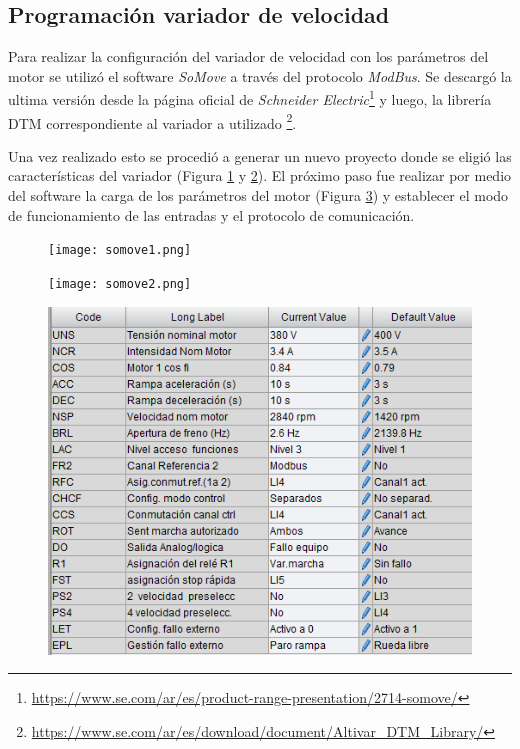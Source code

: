 
\subsection{Programación variador de velocidad}


Para realizar la configuración del variador de velocidad con los parámetros del motor se utilizó el software \textit{SoMove} a través del protocolo \textit{ModBus}. Se descargó la ultima versión desde la página oficial de \textit{Schneider Electric}\footnote{\url{https://www.se.com/ar/es/product-range-presentation/2714-somove/}} y luego, la librería DTM correspondiente al variador a utilizado \footnote{\url{https://www.se.com/ar/es/download/document/Altivar_DTM_Library/}}.

Una vez realizado esto se procedió a generar un nuevo proyecto donde se eligió las características del variador (Figura \ref{fig:so1} y \ref{fig:so2}). El próximo paso fue realizar por medio del software la carga de los parámetros del motor (Figura \ref{fig:paramsomove}) y establecer el modo de funcionamiento de las entradas y el protocolo de comunicación.
\begin{figure}[h]
	\centering
	\texttt{[image: somove1.png]}
	\label{fig:so1}
\end{figure}
\begin{figure}[H]
	\centering
	\texttt{[image: somove2.png]}
	\label{fig:so2}
\end{figure}

\begin{figure}[H]
	\centering
	\includegraphics[width=0.7\linewidth]{images/paramsomove}
	\label{fig:paramsomove}
\end{figure}


